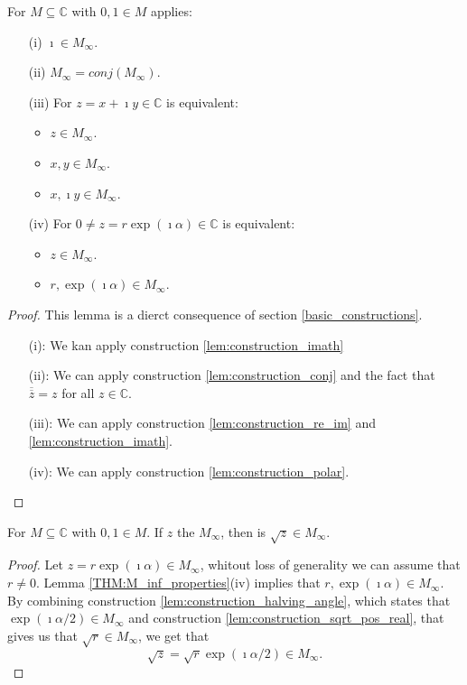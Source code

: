 \begin{lemma}
    \label{THM:M_inf_properties}
    For $M\subseteq \mathbb{C}$ with $0,1 \in M$ applies:
    \begin{itemize}
        \item[(i)] $\imath \in M_{\infty}$.
        \item[(ii)] $M_{\infty} = conj(M_{\infty})$.
        \item[(iii)] For $z = x + \imath y \in \mathbb{C}$ is equivalent:
            \begin{itemize}
                \item $z \in M_{\infty}$.
                \item $x, y \in M_{\infty}$.
                \item $x, \imath y \in M_{\infty}$.
            \end{itemize}
        \item[(iv)] For $0 \ne z = r \exp(\imath \alpha) \in \mathbb{C}$ is equivalent:
            \begin{itemize}
                \item $z \in M_{\infty}$.
                \item $r,\exp(\imath \alpha) \in M_{\infty}$.
            \end{itemize}
    \end{itemize}
\end{lemma}
\begin{proof}
    This lemma is a dierct consequence of section \ref{basic_constructions}.
    \begin{itemize}
        \item[(i):] We kan apply construction \ref{lem:construction_imath}
        \item[(ii):] We can apply construction \ref{lem:construction_conj} and the fact that $\overline{\overline z} = z$ for all $z \in\mathbb{C}$.
        \item[(iii):] We can apply construction \ref{lem:construction_re_im} and \ref{lem:construction_imath}.
        \item[(iv):] We can apply construction \ref{lem:construction_polar}.
    \end{itemize}
\end{proof}

\begin{lemma}
    \label{lem:sqrt_in_M_inf}
    For $M\subseteq \mathbb{C}$ with $0,1 \in M$. If $z$ the $M_{\infty}$, then is $\sqrt{z} \in M_{\infty}$.
\end{lemma}
\begin{proof}
    Let $z = r \exp(\imath \alpha) \in M_{\infty}$, whitout loss of generality we can assume that $r \ne 0$. 
    Lemma \ref{THM:M_inf_properties}(iv) implies that $r, \exp(\imath \alpha) \in M_{\infty}$. By combining construction \ref{lem:construction_halving_angle},
    which states that $\exp(\imath \alpha / 2) \in M_{\infty}$ and construction \ref{lem:construction_sqrt_pos_real},
    that gives us that $\sqrt{r} \in M_{\infty}$, we get that $$\sqrt{z} = \sqrt{r} \exp(\imath \alpha / 2) \in M_{\infty}.$$
\end{proof}

